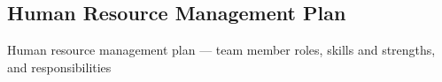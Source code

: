 \subsection{Human Resource Management Plan}

Human resource management plan — team member roles, skills and strengths, and responsibilities
